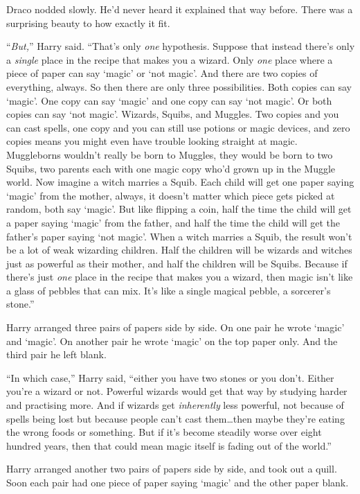Draco nodded slowly. He’d never heard it explained that way before. There was a
surprising beauty to how exactly it fit.

“\emph{But,}” Harry said. “That’s only \emph{one} hypothesis. Suppose that
instead there’s only a \emph{single} place in the recipe that makes you a
wizard. Only \emph{one} place where a piece of paper can say ‘magic’ or ‘not
magic’. And there are two copies of everything, always. So then there are only
three possibilities. Both copies can say ‘magic’. One copy can say ‘magic’ and
one copy can say ‘not magic’. Or both copies can say ‘not magic’. Wizards,
Squibs, and Muggles. Two copies and you can cast spells, one copy and you can
still use potions or magic devices, and zero copies means you might even have
trouble looking straight at magic. Muggleborns wouldn’t really be born to
Muggles, they would be born to two Squibs, two parents each with one magic copy
who’d grown up in the Muggle world. Now imagine a witch marries a Squib. Each
child will get one paper saying ‘magic’ from the mother, always, it doesn’t
matter which piece gets picked at random, both say ‘magic’. But like flipping a
coin, half the time the child will get a paper saying ‘magic’ from the father,
and half the time the child will get the father’s paper saying ‘not magic’.
When a witch marries a Squib, the result won’t be a lot of weak wizarding
children. Half the children will be wizards and witches just as powerful as
their mother, and half the children will be Squibs. Because if there’s just
\emph{one} place in the recipe that makes you a wizard, then magic isn’t like a
glass of pebbles that can mix. It’s like a single magical pebble, a sorcerer’s
stone.”

Harry arranged three pairs of papers side by side. On one pair he wrote ‘magic’
and ‘magic’. On another pair he wrote ‘magic’ on the top paper only. And the
third pair he left blank.

“In which case,” Harry said, “either you have two stones or you don’t. Either
you’re a wizard or not. Powerful wizards would get that way by studying harder
and practising more. And if wizards get \emph{inherently} less powerful, not
because of spells being lost but because people can’t cast them…then
maybe they’re eating the wrong foods or something. But if it’s become steadily
worse over eight hundred years, then that could mean magic itself is fading out
of the world.”

Harry arranged another two pairs of papers side by side, and took out a quill.
Soon each pair had one piece of paper saying ‘magic’ and the other paper blank.

